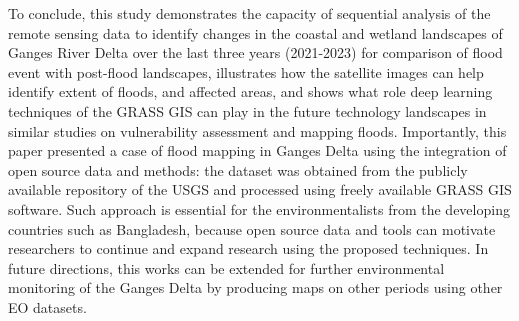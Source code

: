 \documentclass[water,article,submit,pdftex,moreauthors]{Definitions/mdpi}
\begin{document}
To conclude, this study demonstrates the capacity of sequential analysis of the remote sensing data to identify changes in the coastal and wetland landscapes of Ganges River Delta over the last three years (2021-2023) for comparison of flood event with post-flood landscapes, illustrates how the satellite images can help identify extent of floods, and affected areas, and shows what role deep learning techniques of the GRASS GIS can play in the future technology landscapes in similar studies on vulnerability assessment and mapping floods. Importantly, this paper presented a case of flood mapping in Ganges Delta using the integration of open source data and methods: the dataset was obtained from the publicly available repository of the USGS and processed using freely available GRASS GIS software. Such approach is essential for the environmentalists from the developing countries such as Bangladesh, because open source data and tools can motivate researchers to continue and expand research using the proposed techniques. In future directions, this works can be extended for further environmental monitoring of the Ganges Delta by producing maps on other periods using other EO datasets. 






\end{document}
